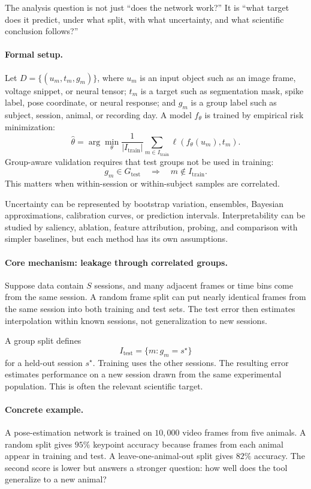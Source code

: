 The analysis question is not just ``does the network work?'' It is ``what target does it predict, under what split, with what uncertainty, and what scientific conclusion follows?''

\paragraph{Formal setup.}
Let \(D=\{(u_m,t_m,g_m)\}\), where \(u_m\) is an input object such as an image frame, voltage snippet, or neural tensor; \(t_m\) is a target such as segmentation mask, spike label, pose coordinate, or neural response; and \(g_m\) is a group label such as subject, session, animal, or recording day. A model \(f_\theta\) is trained by empirical risk minimization:
\[
\widehat\theta=\arg\min_\theta
\frac{1}{|I_{\mathrm{train}}|}
\sum_{m\in I_{\mathrm{train}}}\ell(f_\theta(u_m),t_m).
\]
Group-aware validation requires that test groups not be used in training:
\[
g_m\in G_{\mathrm{test}}\quad\Rightarrow\quad m\notin I_{\mathrm{train}}.
\]
This matters when within-session or within-subject samples are correlated.

Uncertainty can be represented by bootstrap variation, ensembles, Bayesian approximations, calibration curves, or prediction intervals. Interpretability can be studied by saliency, ablation, feature attribution, probing, and comparison with simpler baselines, but each method has its own assumptions.

\paragraph{Core mechanism: leakage through correlated groups.}
Suppose data contain \(S\) sessions, and many adjacent frames or time bins come from the same session. A random frame split can put nearly identical frames from the same session into both training and test sets. The test error then estimates interpolation within known sessions, not generalization to new sessions.

A group split defines
\[
I_{\mathrm{test}}=\{m:g_m=s^\star\}
\]
for a held-out session \(s^\star\). Training uses the other sessions. The resulting error estimates performance on a new session drawn from the same experimental population. This is often the relevant scientific target.

\paragraph{Concrete example.}
A pose-estimation network is trained on \(10{,}000\) video frames from five animals. A random split gives \(95\%\) keypoint accuracy because frames from each animal appear in training and test. A leave-one-animal-out split gives \(82\%\) accuracy. The second score is lower but answers a stronger question: how well does the tool generalize to a new animal?

